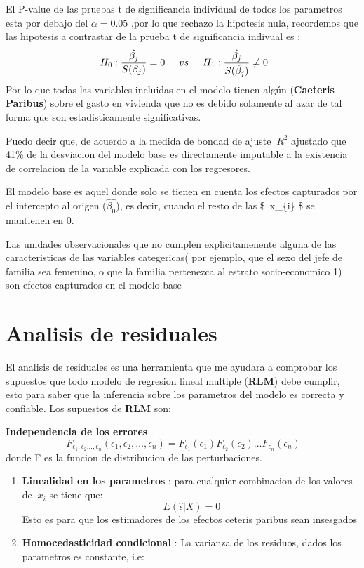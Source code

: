 \documentclass[]{book}
\begin{document}
El P-value de las pruebas t de significancia individual de todos los
parametros esta por debajo del \(\alpha = 0.05\) ,por lo que rechazo la
hipotesis nula, recordemos que las hipotesis a contrastar de la prueba t
de significancia indivual es :
\[ \ H_{0}:\frac{\hat{\beta_{j}}}{S(\beta_{j})} = 0 \hspace{0.5cm} vs \hspace{0.5cm} H_{1} : \frac{\hat{\beta_{j}}}{S(\hat{\beta_{j}})} \neq 0\]
Por lo que todas las variables incluidas en el modelo tienen algún
(\textbf{Caeteris Paribus}) sobre el gasto en vivienda que no es debido
solamente al azar de tal forma que son estadisticamente significativas.

Puedo decir que, de acuerdo a la medida de bondad de ajuste \(\ R^{2}\)
ajustado que 41\% de la desviacion del modelo base es directamente
imputable a la existencia de correlacion de la variable explicada con
los regresores.

El modelo base es aquel donde solo se tienen en cuenta los efectos
capturados por el intercepto al origen (\(\hat{\beta_{0}}\)), es decir,
cuando el resto de las \$~x\_\{i\} \$ se mantienen en 0.

Las unidades observacionales que no cumplen explicitamenente alguna de
las caracteristicas de las variables categericas( por ejemplo, que el
sexo del jefe de familia sea femenino, o que la familia pertenezca al
estrato socio-economico 1) son efectos capturados en el modelo base

\section{Analisis de residuales}\label{analisis-de-residuales}

El analisis de residuales es una herramienta que me ayudara a comprobar
los supuestos que todo modelo de regresion lineal multiple
(\textbf{RLM}) debe cumplir, esto para saber que la inferencia sobre los
parametros del modelo es correcta y confiable. Los supuestos de
\textbf{RLM} son:

\textbf{Independencia de los errores}
\[ \ F_{\epsilon_{1},\epsilon_{2}\dots,\epsilon_{n}}(\epsilon_{1},\epsilon_{2},\dots,\epsilon_{n}) = F_{\epsilon_{1}}(\epsilon_{1}) F_{\epsilon_{2}}(\epsilon_{2})\dots  F_{\epsilon_{n}}(\epsilon_{n}) \]
donde F es la funcion de distribucion de las perturbaciones.

\begin{enumerate}
\def\labelenumi{\arabic{enumi}.}
\item
  \textbf{Linealidad en los parametros} : para cualquier combinacion de
  los valores de \(\ x_{i}\) se tiene que:\\
  \[ \ E(\hat{\epsilon}|X) = 0 \] Esto es para que los estimadores de
  los efectos ceteris paribus sean insesgados
\item
  \textbf{Homocedasticidad condicional} : La varianza de los residuos,
  dados los parametros es constante, i.e:
\end{enumerate}
\end{document}
